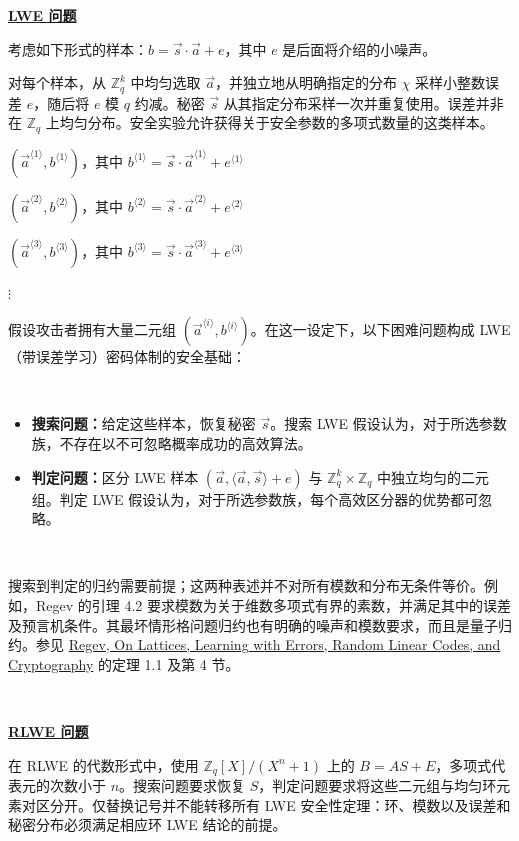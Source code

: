 \begin{tcolorbox}[title={\textbf{\tboxlabel{\ref*{subsec:lattice-overview}} LWE（带误差学习）与 RLWE 问题}}]
\textbf{\underline{LWE 问题}}

考虑如下形式的样本：$b = \vec{s} \cdot\vec{a} + e$，其中 $e$ 是后面将介绍的小噪声。

对每个样本，从 $\mathbb Z_q^k$ 中均匀选取 $\vec a$，并独立地从明确指定的分布 $\chi$ 采样小整数误差 $e$，随后将 $e$ 模 $q$ 约减。秘密 $\vec s$ 从其指定分布采样一次并重复使用。误差并非在 $\mathbb Z_q$ 上均匀分布。安全实验允许获得关于安全参数的多项式数量的这类样本。

$(\vec{a}^{\langle 1 \rangle}, b^{\langle 1 \rangle})$，其中 $b^{\langle 1 \rangle} = \vec{s} \cdot \vec{a}^{\langle 1 \rangle} + e^{\langle 1 \rangle}$

$(\vec{a}^{\langle 2 \rangle}, b^{\langle 2 \rangle})$，其中 $b^{\langle 2 \rangle} = \vec{s} \cdot \vec{a}^{\langle 2 \rangle} + e^{\langle 2 \rangle}$

$(\vec{a}^{\langle 3 \rangle}, b^{\langle 3 \rangle})$，其中 $b^{\langle 3 \rangle} = \vec{s} \cdot \vec{a}^{\langle 3 \rangle} + e^{\langle 3 \rangle}$

\text{ } $\vdots$

假设攻击者拥有大量二元组 $(\vec{a}^{\langle i \rangle}, b^{\langle i \rangle})$。在这一设定下，以下困难问题构成 LWE（带误差学习）密码体制的安全基础：

$ $

\begin{itemize}
\item \textbf{搜索问题：}给定这些样本，恢复秘密 $\vec s$。搜索 LWE 假设认为，对于所选参数族，不存在以不可忽略概率成功的高效算法。
\item \textbf{判定问题：}区分 LWE 样本 $(\vec a,\langle\vec a,\vec s\rangle+e)$ 与 $\mathbb Z_q^k\times\mathbb Z_q$ 中独立均匀的二元组。判定 LWE 假设认为，对于所选参数族，每个高效区分器的优势都可忽略。
\end{itemize}

$ $

搜索到判定的归约需要前提；这两种表述并不对所有模数和分布无条件等价。例如，Regev 的引理 4.2 要求模数为关于维数多项式有界的素数，并满足其中的误差及预言机条件。其最坏情形格问题归约也有明确的噪声和模数要求，而且是量子归约。参见 \href{https://cims.nyu.edu/~regev/papers/qcrypto.pdf}{Regev, On Lattices, Learning with Errors, Random Linear Codes, and Cryptography} 的定理 1.1 及第 4 节。

$ $

\textbf{\underline{RLWE 问题}}

在 RLWE 的代数形式中，使用 $\mathbb Z_q[X]/(X^n+1)$ 上的 $B=AS+E$，多项式代表元的次数小于 $n$。搜索问题要求恢复 $S$，判定问题要求将这些二元组与均匀环元素对区分开。仅替换记号并不能转移所有 LWE 安全性定理：环、模数以及误差和秘密分布必须满足相应环 LWE 结论的前提。

\end{tcolorbox}




